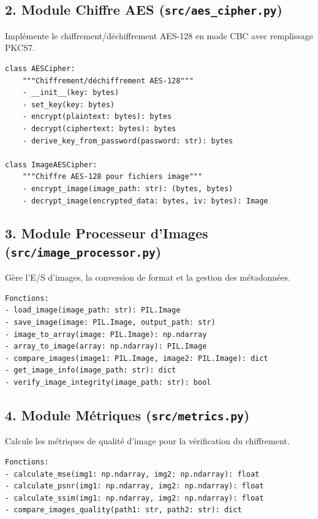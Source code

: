 \documentclass[12pt,a4paper]{report}
\begin{document}
\subsection{2. Module Chiffre AES (\texttt{src/aes\_cipher.py})}

Implémente le chiffrement/déchiffrement AES-128 en mode CBC avec remplissage PKCS7.

\begin{lstlisting}[caption=Classes du Chiffre AES]
class AESCipher:
    """Chiffrement/déchiffrement AES-128"""
    - __init__(key: bytes)
    - set_key(key: bytes)
    - encrypt(plaintext: bytes): bytes
    - decrypt(ciphertext: bytes): bytes
    - derive_key_from_password(password: str): bytes

class ImageAESCipher:
    """Chiffre AES-128 pour fichiers image"""
    - encrypt_image(image_path: str): (bytes, bytes)
    - decrypt_image(encrypted_data: bytes, iv: bytes): Image
\end{lstlisting}

\subsection{3. Module Processeur d'Images (\texttt{src/image\_processor.py})}

Gère l'E/S d'images, la conversion de format et la gestion des métadonnées.

\begin{lstlisting}[caption=Fonctions du Processeur d'Images]
Fonctions:
- load_image(image_path: str): PIL.Image
- save_image(image: PIL.Image, output_path: str)
- image_to_array(image: PIL.Image): np.ndarray
- array_to_image(array: np.ndarray): PIL.Image
- compare_images(image1: PIL.Image, image2: PIL.Image): dict
- get_image_info(image_path: str): dict
- verify_image_integrity(image_path: str): bool
\end{lstlisting}

\subsection{4. Module Métriques (\texttt{src/metrics.py})}

Calcule les métriques de qualité d'image pour la vérification du chiffrement.

\begin{lstlisting}[caption=Métriques de Qualité]
Fonctions:
- calculate_mse(img1: np.ndarray, img2: np.ndarray): float
- calculate_psnr(img1: np.ndarray, img2: np.ndarray): float
- calculate_ssim(img1: np.ndarray, img2: np.ndarray): float
- compare_images_quality(path1: str, path2: str): dict
\end{lstlisting}
\end{document}
